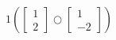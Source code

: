 $1\left(\begin{bmatrix} 1 \\ 2 \end{bmatrix} \bigcirc \begin{bmatrix} 1 \\ -2 \end{bmatrix}\right) $

